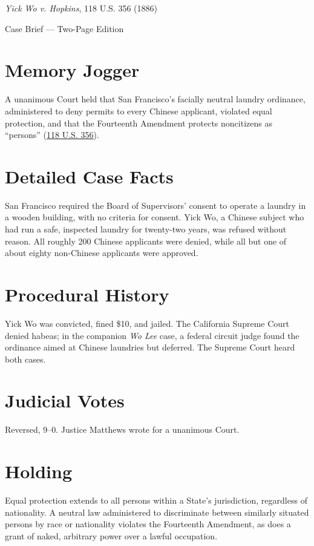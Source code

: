 \documentclass[12pt]{article}
\begin{document}
\begin{center}
{\LARGE \textit{Yick Wo v. Hopkins}, 118 U.S. 356 (1886)\par}
\vspace{0.5em}
{\large Case Brief --- Two-Page Edition\par}
\end{center}

\section{Memory Jogger}
A unanimous Court held that San Francisco's facially neutral laundry ordinance, administered to deny permits to every Chinese applicant, violated equal protection, and that the Fourteenth Amendment protects noncitizens as ``persons'' (\href{https://supreme.justia.com/cases/federal/us/118/356/}{118 U.S. 356}).

\section{Detailed Case Facts}
San Francisco required the Board of Supervisors' consent to operate a laundry in a wooden building, with no criteria for consent. Yick Wo, a Chinese subject who had run a safe, inspected laundry for twenty-two years, was refused without reason. All roughly 200 Chinese applicants were denied, while all but one of about eighty non-Chinese applicants were approved.

\section{Procedural History}
Yick Wo was convicted, fined \$10, and jailed. The California Supreme Court denied habeas; in the companion \textit{Wo Lee} case, a federal circuit judge found the ordinance aimed at Chinese laundries but deferred. The Supreme Court heard both cases.

\section{Judicial Votes}
Reversed, 9--0. Justice Matthews wrote for a unanimous Court.

\section{Holding}
Equal protection extends to all persons within a State's jurisdiction, regardless of nationality. A neutral law administered to discriminate between similarly situated persons by race or nationality violates the Fourteenth Amendment, as does a grant of naked, arbitrary power over a lawful occupation.
\end{document}
